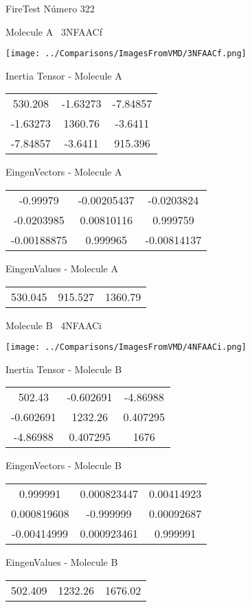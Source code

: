 \vtab[-3cm]
\begin{center}
{\large FireTest \tab Número 322}
\end{center}
\begin{multicols}{2}
\begin{center}

Molecule A \
3NFAACf

\texttt{[image: ../Comparisons/ImagesFromVMD/3NFAACf.png]}

Inertia Tensor - Molecule A \\
\begin{tabular}{|c c c|}
530.208	 & 	-1.63273	 & 	-7.84857	 \\
-1.63273	 & 	1360.76	 & 	-3.6411	 \\
-7.84857	 & 	-3.6411	 & 	915.396
\end{tabular}

\vtab
 EingenVectors - Molecule A     \\
\begin{tabular}{|c c c|}
-0.99979	 & 	-0.00205437	 & 	-0.0203824	 \\
-0.0203985	 & 	0.00810116	 & 	0.999759	 \\
-0.00188875	 & 	0.999965	 & 	-0.00814137
\end{tabular}

\vtab
 EingenValues - Molecule A     \\
\begin{tabular}{|c c c|}
530.045	 & 	915.527	 & 	1360.79	 \\
\end{tabular}
\columnbreak

Molecule B \
4NFAACi

\texttt{[image: ../Comparisons/ImagesFromVMD/4NFAACi.png]}

Inertia Tensor - Molecule B \\
\begin{tabular}{|c c c|}
502.43	 & 	-0.602691	 & 	-4.86988	 \\
-0.602691	 & 	1232.26	 & 	0.407295	 \\
-4.86988	 & 	0.407295	 & 	1676
\end{tabular}

\vtab
 EingenVectors - Molecule B     \\
\begin{tabular}{|c c c|}
0.999991	 & 	0.000823447	 & 	0.00414923	 \\
0.000819608	 & 	-0.999999	 & 	0.00092687	 \\
-0.00414999	 & 	0.000923461	 & 	0.999991
\end{tabular}

\vtab
 EingenValues - Molecule B     \\
\begin{tabular}{|c c c|}
502.409	 & 	1232.26	 & 	1676.02	 \\
\end{tabular}

\end{center}
\end{multicols}

